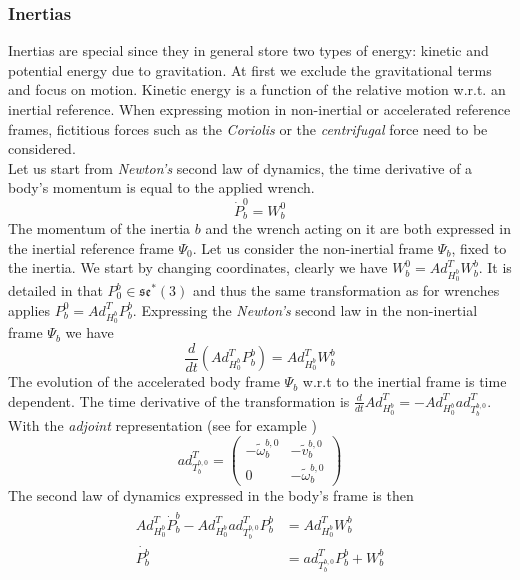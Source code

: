 \documentclass[a4paper,twoside, openright,12pt]{report}
\begin{document}
\subsubsection{Inertias}
Inertias are special since they in general store two types of energy: kinetic and potential energy due to gravitation. At first we exclude the gravitational terms and focus on motion. Kinetic energy is a function of the relative motion w.r.t. an inertial reference. When expressing motion in non-inertial or accelerated reference frames, fictitious forces such as the \emph{Coriolis} or the \emph{centrifugal} force need to be considered.\\
Let us start from \emph{Newton's} second law of dynamics, the time derivative of a body's momentum is equal to the applied wrench.
\begin{equation}
\dot{P}_b^0 = W_b^0
\end{equation}
The momentum of the inertia $b$ and the wrench acting on it are both expressed in the inertial reference frame $\Psi_0$. Let us consider the non-inertial frame $\Psi_b$, fixed to the inertia. We start by changing coordinates, clearly we have $W_b^0 = Ad_{H_0^b}^T W_b^b$. It is detailed in \cite{Stramigioli_01} that $P_0^b \in \mathfrak{se}^*(3)$ and thus the same transformation as for wrenches applies $P_b^0 = Ad_{H_0^b}^T P_b^b$. Expressing the \emph{Newton's} second law in the non-inertial frame $\Psi_b$ we have
\begin{equation}
\frac{d}{dt}(Ad_{H_0^b}^T P_b^b) = Ad_{H_0^b}^T W_b^b
\end{equation}
The evolution of the accelerated body frame $\Psi_b$ w.r.t to the inertial frame is time dependent. The time derivative of the transformation is $\frac{d}{dt}Ad_{H_0^b}^T = -Ad_{H_0^b}^T ad_{T_b^{b,0}}^T $. With the \emph{adjoint} representation (see for example \cite{Stramigioli_01b})
\begin{equation}
ad_{T_b^{b,0}}^T = \begin{pmatrix}
-\tilde{\omega}_b^{b,0} & -\tilde{v}_b^{b,0} \\ 0 & -\tilde{\omega}_b^{b,0}\end{pmatrix}
\end{equation}
The second law of dynamics expressed in the body's frame is then
\begin{eqnarray}
\begin{aligned}
Ad_{H_0^b}^T \dot{P}_b^b -Ad_{H_0^b}^T ad_{T_b^{b,0}}^T P_b^b &= Ad_{H_0^b}^T W_b^b \\
\dot{P_b^b} &= ad_{T_b^{b,0}}^T P_b^b + W_b^b
\end{aligned} 
\end{eqnarray}
\end{document}
